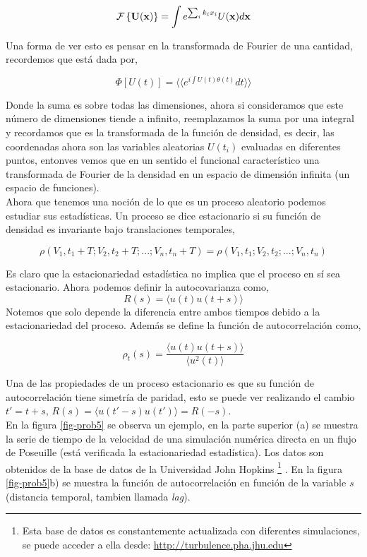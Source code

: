 \documentclass[executivepaper,12pt]{article}
\numberwithin{equation}{section}
\begin{document}
\begin{equation*}
	\mathcal{F}\left\{\vb{U}(\vb{x})\right\} = \int e^{\sum_i k_i x_i } U(\vb{x}) d\vb{x}
\end{equation*}

Una forma de ver esto es pensar en la transformada de Fourier de una cantidad, recordemos que está dada por,

\begin{equation}
	\Phi\left[U(t)\right]=\langle \langle e^{ i \int U(t) \theta(t)} dt \rangle \rangle
\end{equation}

Donde la suma es sobre todas las dimensiones, ahora si consideramos que este número de dimensiones tiende a infinito, reemplazamos la suma por una integral y recordamos que es la transformada de la función de densidad, es decir, las coordenadas ahora son las variables aleatorias $U(t_i)$ evaluadas en diferentes puntos, entonves vemos que en un sentido el funcional característico una transformada de Fourier de la densidad en un espacio de dimensión infinita (un espacio de funciones). \\

Ahora que tenemos una noción de lo que es un proceso aleatorio podemos estudiar sus estadísticas. Un proceso se dice estacionario si su función de densidad es invariante bajo translaciones temporales,

\begin{equation*}
	\rho(V_1,t_1+T;V_2,t_2+T;...;V_n,t_n+T)=\rho(V_1,t_1;V_2,t_2;...;V_n,t_n)
\end{equation*}

Es claro que la estacionariedad estadística no implica que el proceso en sí sea estacionario. Ahora podemos definir la autocovarianza como,
\begin{equation*}
	R(s)=\langle u(t)u(t+s)\rangle
\end{equation*}
Notemos que solo depende la diferencia entre ambos tiempos debido a la estacionariedad del proceso. Además se define la función de autocorrelación como,

\begin{equation*}
	\rho_t(s)=\frac{\langle u(t) u(t+s) \rangle}{\langle u^2(t)\rangle}
\end{equation*}

Una de las propiedades de un proceso estacionario es que su función de autocorrelación tiene simetría de paridad, esto se puede ver realizando el cambio $t'=t+s$, $R(s)=\langle u(t'-s)u(t')\rangle=R(-s)$. \\
En la figura \ref{fig-prob5} se observa un ejemplo, en la parte superior (a) se muestra la serie de tiempo de la velocidad de una simulación numérica directa en un flujo de Poseuille (está verificada la estacionariedad estadística). Los datos son obtenidos de la base de datos de la Universidad John Hopkins \footnote{Esta base de datos es constantemente actualizada con diferentes simulaciones, se puede acceder a ella desde: \href{http://turbulence.pha.jhu.edu}{http://turbulence.pha.jhu.edu}}  \parencite{li2008,lee2015}. En la figura \ref{fig-prob5}b) se muestra la función de autocorrelación en función de la variable $s$ (distancia temporal, tambien llamada \textit{lag}). 
\end{document}
